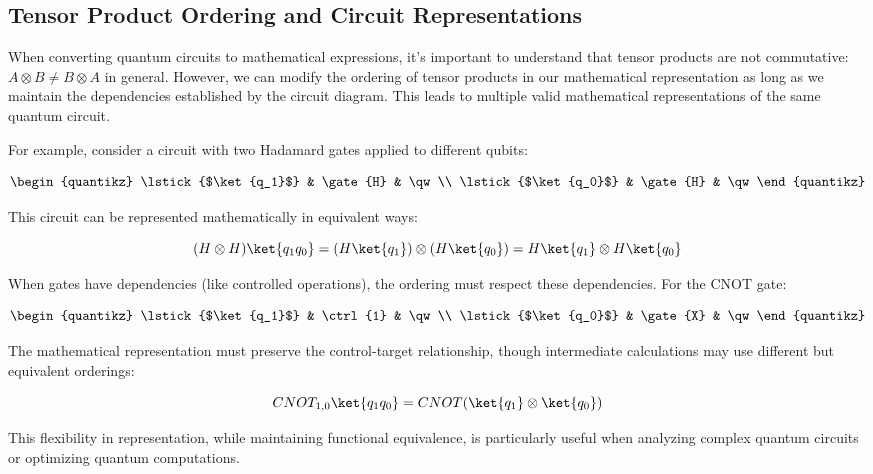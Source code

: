 \subsection*{Tensor Product Ordering and Circuit Representations}

When converting quantum circuits to mathematical expressions, it's important
to understand that tensor products are not commutative: $A \otimes B \neq B
\otimes A$ in general. However, we can modify the ordering of tensor products
in our mathematical representation as long as we maintain the dependencies
established by the circuit diagram. This leads to multiple valid mathematical
representations of the same quantum circuit.


\noindent

For example, consider a circuit with two Hadamard gates applied to different
qubits:

\begin{align*}
  \begin{quantikz}
    \lstick{$\ket{q_1}$} & \gate{H} & \qw \\
    \lstick{$\ket{q_0}$} & \gate{H} & \qw
  \end{quantikz}
\end{align*}

This circuit can be represented mathematically in equivalent ways:

\[
  (H \otimes H)\ket{q_1q_0} = (H\ket{q_1}) \otimes (H\ket{q_0}) = H\ket{q_1}
  \otimes H\ket{q_0}
\]

\noindent
When gates have dependencies (like controlled operations), the ordering must
respect these dependencies. For the CNOT gate:

\begin{align*}
  \begin{quantikz}
    \lstick{$\ket{q_1}$} & \ctrl{1} & \qw \\
    \lstick{$\ket{q_0}$} & \gate{X} & \qw
  \end{quantikz}
\end{align*}

\noindent
The mathematical representation must preserve the control-target
relationship, though intermediate calculations may use different but
equivalent orderings:

\[
  CNOT_{1,0}\ket{q_1q_0} = CNOT(\ket{q_1} \otimes \ket{q_0})
\]

This flexibility in representation, while maintaining functional equivalence,
is particularly useful when analyzing complex quantum circuits or optimizing
quantum computations.

